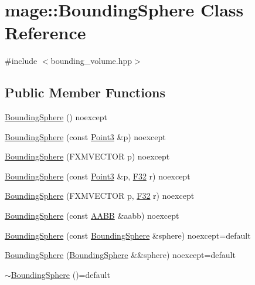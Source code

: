 \hypertarget{classmage_1_1_bounding_sphere}{}\section{mage\+:\+:Bounding\+Sphere Class Reference}
\label{classmage_1_1_bounding_sphere}


{\ttfamily \#include $<$bounding\+\_\+volume.\+hpp$>$}

\subsection*{Public Member Functions}
\begin{DoxyCompactItemize}
\item 
\hyperlink{classmage_1_1_bounding_sphere_a3bf22ae012630101af6578173958aebc}{Bounding\+Sphere} () noexcept
\item 
\hyperlink{classmage_1_1_bounding_sphere_a8f70fd7013b1d2a22545ab659847840f}{Bounding\+Sphere} (const \hyperlink{structmage_1_1_point3}{Point3} \&p) noexcept
\item 
\hyperlink{classmage_1_1_bounding_sphere_a6117f902c00f9ef11633274fca43430f}{Bounding\+Sphere} (F\+X\+M\+V\+E\+C\+T\+OR p) noexcept
\item 
\hyperlink{classmage_1_1_bounding_sphere_a6ac68183ac535e65e49d47c0f2510f9b}{Bounding\+Sphere} (const \hyperlink{structmage_1_1_point3}{Point3} \&p, \hyperlink{namespacemage_aa97e833b45f06d60a0a9c4fc22ae02c0}{F32} r) noexcept
\item 
\hyperlink{classmage_1_1_bounding_sphere_a073f00e18116d12e760f1b1e5a58c3cb}{Bounding\+Sphere} (F\+X\+M\+V\+E\+C\+T\+OR p, \hyperlink{namespacemage_aa97e833b45f06d60a0a9c4fc22ae02c0}{F32} r) noexcept
\item 
\hyperlink{classmage_1_1_bounding_sphere_a78a89519a72bdb06feb4850e5209bc06}{Bounding\+Sphere} (const \hyperlink{classmage_1_1_a_a_b_b}{A\+A\+BB} \&aabb) noexcept
\item 
\hyperlink{classmage_1_1_bounding_sphere_aadd1c7613e09ad807d8a877c8b0906ac}{Bounding\+Sphere} (const \hyperlink{classmage_1_1_bounding_sphere}{Bounding\+Sphere} \&sphere) noexcept=default
\item 
\hyperlink{classmage_1_1_bounding_sphere_a566985b59dd05cc4545c41183338a275}{Bounding\+Sphere} (\hyperlink{classmage_1_1_bounding_sphere}{Bounding\+Sphere} \&\&sphere) noexcept=default
\item 
\hyperlink{classmage_1_1_bounding_sphere_af8c185ef441e95fd1f833e22fdee2bb3}{$\sim$\+Bounding\+Sphere} ()=default

\end{DoxyCompactItemize}
